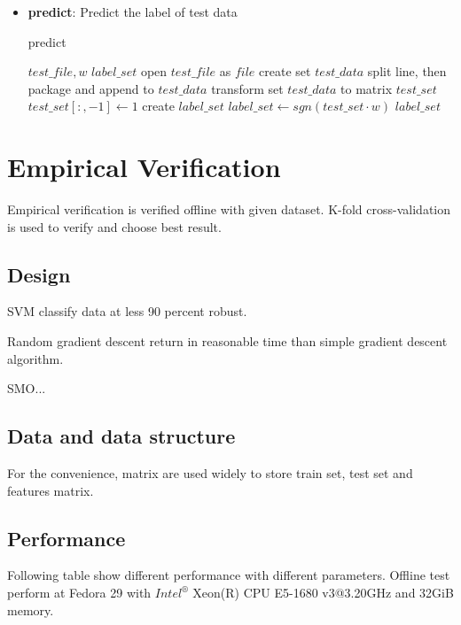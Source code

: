 \documentclass[conference,compsoc]{IEEEtran}
\renewcommand{\algorithmicrequire}{\textbf{Input:}}
\renewcommand{\algorithmicensure}{\textbf{Output:}}
\begin{document}
\begin{itemize}
 \item \textbf{predict}: Predict the label of test data
     \begin{algorithm}[H]
     \caption{predict}
     \begin{algorithmic}[4]
     \renewcommand{\algorithmicrequire}{\textbf{Input:}}
     \renewcommand{\algorithmicensure}{\textbf{Output:}}
     \REQUIRE $test\_file, w$
     \ENSURE  $label\_set$
     \STATE open $test\_file$ as $file$
     \STATE create set $test\_data$
          \STATE split line, then package and append to $test\_data$
     \ENDFOR
     \STATE transform set $test\_data$ to matrix $test\_set$
     \STATE $test\_set[:, -1] \leftarrow 1$
     \STATE create $label\_set$
     \STATE $label\_set \leftarrow  sgn(test\_set\cdot{w})$
     \RETURN $label\_set$
     \end{algorithmic}
     \end{algorithm}
 

\end{itemize}


\section{Empirical Verification}
Empirical verification is verified offline with given dataset. K-fold
cross-validation is used to verify and choose best result.

\subsection{Design}
SVM classify data at less 90 percent robust.

Random gradient descent return in reasonable time than simple gradient
descent algorithm.

SMO...

\subsection{Data and data structure}
For the convenience, matrix are used widely to store train set, test set and
features matrix.

\subsection{Performance}
Following table show different performance with different parameters. Offline
test perform at Fedora 29 with $Intel^{®}$ Xeon(R) CPU E5-1680 v3@3.20GHz and
32GiB memory.
\end{document}
